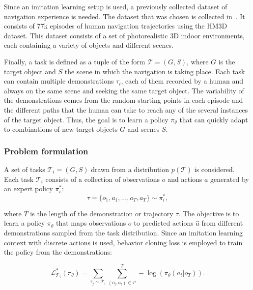 Since an imitation learning setup is used, a previously collected dataset of navigation experience is needed.
The dataset that was chosen is collected in~\cite{ramrakhya2023}.
It consists of 77k episodes of human navigation trajectories using the HM3D~\cite{Ramakrishnan2021HabitatMatterport3D} dataset.
This dataset consists of a set of photorealistic 3D indoor environments, each containing a variety of objects and different scenes.

Finally, a task is defined as a tuple of the form $\mathcal{T} = (G, S)$, where $G$ is the target object and $S$ the scene in which the navigation is taking place.
Each task can contain multiple demonstrations $\tau_i$, each of them recorded by a human and always on the same scene and seeking the same target object.
The variability of the demonstrations comes from the random starting points in each episode and the different paths that the human can take to reach any of the several instances of the target object.
Thus, the goal is to learn a policy $\pi_\theta$ that can quickly adapt to combinations of new target objects $G$ and scenes $S$.

\subsubsection{Problem formulation}\label{subsubsec:problem-formulation}

A set of tasks $\mathcal{T}_i = (G, S)$ drawn from a distribution $p(\mathcal{T})$ is considered.
Each task $\mathcal{T}_i$ consists of a collection of observations $o$ and actions $a$ generated by an expert policy $\pi^*_i$:
\begin{equation}
    \tau = \{o_1, a_1, \dots, o_T, a_T\} \sim \pi^*_i,
\end{equation}

where $T$ is the length of the demonstration or trajectory $\tau$.
The objective is to learn a policy $\pi_\theta$ that maps observations $o$ to predicted actions $\hat{a}$ from different demonstrations sampled from the task distribution.
Since an imitation learning context with discrete actions is used, behavior cloning loss is employed to train the policy from the demonstrations:

\begin{equation}
    \mathcal{L}^*_{\mathcal{T}_i}(\pi_\theta) = \sum_{\tau_j \sim \mathcal{T}_i} \sum_{(o_t, a_t) \in \tau^i}^T -\log (\pi_\theta(a_t|o_T)).
    \label{eq:loss_metanav}
\end{equation}

